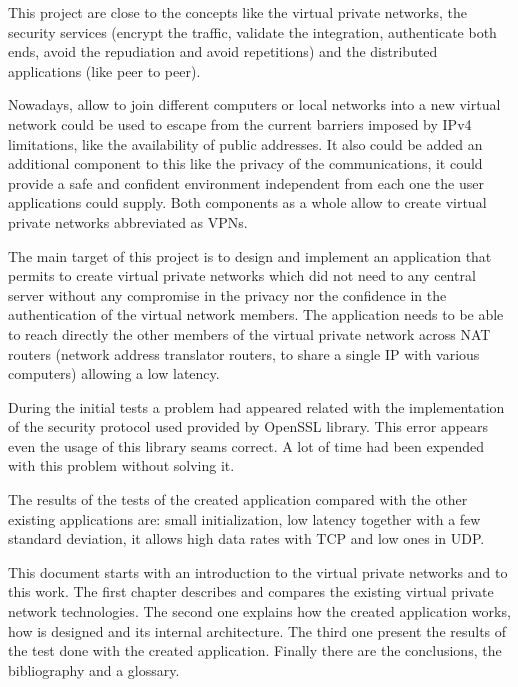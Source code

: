 \begin{overview}{4.7cm}
This project are close to the concepts like the virtual private networks, the security services (encrypt the traffic, validate the integration, authenticate both ends, avoid the repudiation and avoid repetitions) and the distributed applications (like peer to peer).

Nowadays, allow to join different computers or local networks into a new virtual network could be used to escape from the current barriers imposed by IPv4 limitations, like the availability of public addresses. It also could be added an additional component to this like the privacy of the communications, it could provide a safe and confident environment independent from each one the user applications could supply. Both components as a whole allow to create virtual private networks abbreviated as VPNs.

The main target of this project is to design and implement an application that permits to create virtual private networks which did not need to any central server without any compromise in the privacy nor the confidence in the authentication of the virtual network members.
The application needs to be able to reach directly the other members of the virtual private network across NAT routers (network address translator routers, to share a single IP with various computers) allowing a low latency.

During the initial tests a problem had appeared related with the implementation of the security protocol used provided by OpenSSL library. This error appears even the usage of this library seams correct. A lot of time had been expended with this problem without solving it.

The results of the tests of the created application compared with the other existing applications are: small initialization, low latency together with a few standard deviation, it allows high data rates with TCP and low ones in UDP.

This document starts with an introduction to the virtual private networks and to this work.
The first chapter describes and compares the existing virtual private network technologies.
The second one explains how the created application works, how is designed and its internal architecture.
The third one present the results of the test done with the created application.
Finally there are the conclusions, the bibliography and a glossary.
\end{overview}

